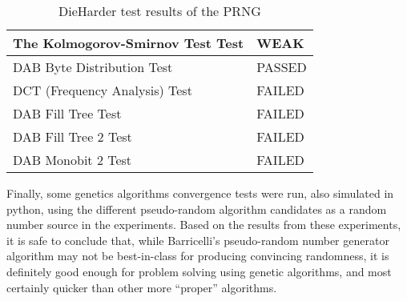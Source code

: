 \begin{table}[H]
\begin{tabular}{| l | l |}
    \hline
    The Kolmogorov-Smirnov Test Test & WEAK \\
    \hline
    DAB Byte Distribution Test & PASSED \\
    \hline
    DCT (Frequency Analysis) Test & FAILED \\
    \hline
    DAB Fill Tree Test & FAILED \\
    \hline
    DAB Fill Tree 2 Test & FAILED \\
    \hline
    DAB Monobit 2 Test & FAILED \\
    \hline
  \end{tabular}
  \caption{DieHarder test results of the PRNG}
  \label{testing:prng:1-time}
\end{table}


Finally, some genetics algorithms convergence tests were run, also simulated in python, using the different pseudo-random algorithm candidates as a random number source in the experiments.
Based on the results from these experiments, it is safe to conclude that, while Barricelli's pseudo-random number generator algorithm may not be best-in-class for producing convincing randomness, it is definitely good enough for problem solving using genetic algorithms, and most certainly quicker than other more ``proper'' algorithms.




